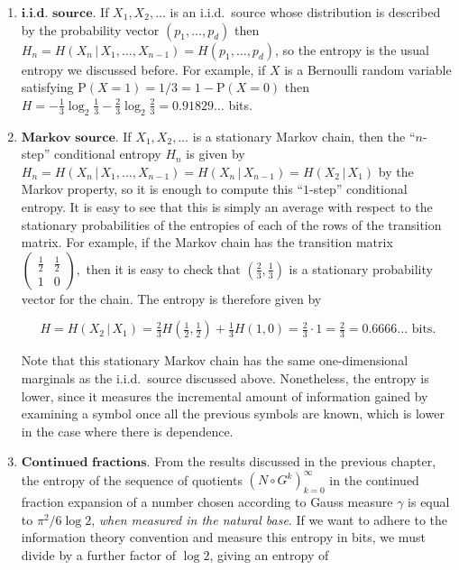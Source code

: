 \begin{enumerate}[label=\arabic*.]
\item $\textbf{i.i.d. source.}$ If $X_1,X_2,\ldots$ is an
i.i.d.\ source whose distribution is described by the
probability vector $(p_1,\ldots,p_d)$ then
$H_n=H(X_n\,|\,X_1,\ldots,X_{n-1})=H(p_1,\ldots,p_d)$,
so the entropy is the usual entropy we discussed
before. For example, if $X$ is a Bernoulli random
variable satisfying
$\mathrm{P}(X=1)=1/3=1-\mathrm{P}(X=0)$ then
$H=-\tfrac13 \log_2 \tfrac13 - \tfrac23 \log_2
\tfrac23 = 0.91829\ldots$
bits.

\item $\textbf{Markov source.}$ If $X_1,X_2,\ldots$ is a
stationary Markov chain, then the ``$n$-step''
conditional entropy $H_n$ is given by
$H_n=H(X_n\,|\,X_1,\ldots,X_{n-1})=
H(X_n\,|\,X_{n-1}) = H(X_2\,|\,X_1)$
by the Markov property, so it is enough to compute
this ``$1$-step'' conditional entropy. It is easy to
see that this is simply an average with respect to the
stationary probabilities of the entropies of each of
the rows of the transition matrix. For example, if the
Markov chain has the transition matrix
$\left( \begin{array}{cc} \tfrac12 & \tfrac12 \\ 1&0
\end{array} \right),$
then it is easy to check that $(\tfrac23,\tfrac13)$
is a stationary probability vector for the chain. The
entropy is therefore given by

\[
H = H(X_2\,|\,X_1) = \tfrac23 H(\tfrac12,\tfrac12) + \tfrac13 H(1,0) = \tfrac23 \cdot 1 = \tfrac 23 = 0.6666\ldots \textrm{ bits}.
\]

\noindent Note that this stationary Markov chain has the same
one-dimensional marginals as the i.i.d.\ source
discussed above. Nonetheless, the entropy is lower,
since it measures the incremental amount of
information gained by examining a symbol once all the
previous symbols are known, which is lower in the case
where there is dependence.

\item $\textbf{Continued fractions.}$ From the results
discussed in the previous chapter, the entropy of the
sequence of quotients $(N\circ G^k)_{k=0}^\infty$ in
the continued fraction expansion of a number chosen
according to Gauss measure $\gamma$ is equal to
$\pi^2/6\log 2$, \emph{when measured in the natural base}.
If we want to adhere to the information theory
convention and measure this entropy in bits, we must
divide by a further factor of $\log 2$, giving an
entropy of


\end{enumerate}
